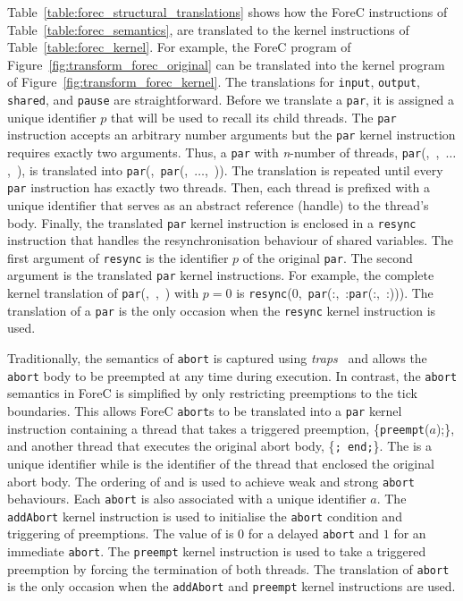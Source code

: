 Table~\ref{table:forec_structural_translations} shows how 
the ForeC instructions of Table~\ref{table:forec_semantics}, 
are translated to the kernel instructions of Table~\ref{table:forec_kernel}.
For example, the ForeC program of 
Figure~\ref{fig:transform_forec_original} can be
translated into the kernel program of 
Figure~\ref{fig:transform_forec_kernel}.
The translations for \verb$input$, \verb$output$, \verb$shared$, and 
\verb$pause$ are straightforward. Before we translate a \verb$par$,
it is assigned a unique identifier $p$ that will be used to recall 
its child threads. The \verb$par$ instruction accepts 
an arbitrary number arguments but the \verb$par$ kernel 
instruction requires exactly two arguments. Thus, a \verb$par$
with \emph{n}-number of threads, \verb$par$(,~,~$\dots$,~), 
is translated into \verb$par$(,~\verb$par$(,~$\dots$,~)). 
The translation is repeated until every \verb$par$ 
instruction has exactly two threads. Then, each thread \body{} is 
prefixed with a unique identifier \thread{} that serves as 
an abstract reference (handle) to the thread's body. 
Finally, the translated \verb$par$ kernel instruction is enclosed in 
a \verb$resync$ instruction that handles the resynchronisation 
behaviour of shared variables. The first argument of \verb$resync$ is
the identifier $p$ of the original \verb$par$. The
second argument is the translated \verb$par$ kernel instructions. 
For example, the complete kernel translation of \verb$par$(,~,~) 
with $p = 0$ is 
\verb$resync$($0$,~\verb$par$(:,~:\verb$par$(:,~:))).
The translation of a \verb$par$ is the only occasion when the 
\verb$resync$ kernel instruction is used.

Traditionally, the semantics of \verb$abort$ is captured using 
\emph{traps}~\cite{EsterelV7} and allows the \verb$abort$ body 
to be preempted at any time during execution. In contrast, the 
\verb$abort$ semantics in ForeC is simplified by only restricting 
preemptions to the tick boundaries. This allows ForeC \verb$abort$s 
to be translated into a \verb$par$ kernel instruction containing 
a thread  that takes a triggered preemption, 
\{\verb$preempt$($a$);\}, and another thread  that executes 
the original abort body, \{\body{}\verb$; end;$\}. The  
is a unique identifier while  is the identifier of the 
thread that enclosed the original abort body.
The ordering of  and  is used to achieve 
weak and strong \verb$abort$ behaviours. Each \verb$abort$
is also associated with a unique identifier $a$. The \verb$addAbort$
kernel instruction is used to initialise the \verb$abort$ condition
and triggering of preemptions. The value of \imm{} 
is $0$ for a delayed \verb$abort$ and $1$ for an immediate \verb$abort$.
The \verb$preempt$ kernel instruction is used to 
take a triggered preemption by forcing the termination of 
both threads. The translation of \verb$abort$ is the only
occasion when the \verb$addAbort$ and \verb$preempt$ kernel
instructions are used.


